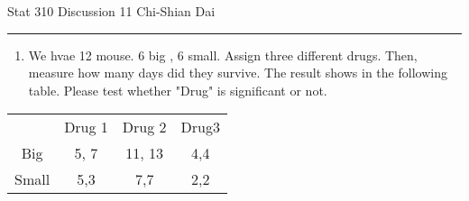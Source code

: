 \documentclass[12pt]{article}
\begin{document}
	\noindent Stat 310 \hfill  Discussion 11 \hfill Chi-Shian Dai
\smallskip
	\hrule
\begin{enumerate}
\item We hvae 12 mouse. 6 big , 6 small. Assign three different drugs. Then, measure how many days did they survive. The result shows in the following table.
Please test whether "Drug" is significant or not.

\end{enumerate}

\begin{table}[h]
	\footnotesize
	\begin{tabular} {cccc}
		&Drug 1&Drug 2& Drug3\\
		Big	& 5, 7 & 11, 13 & 4,4\\
		Small&  5,3 &7,7  & 2,2
	\end{tabular}
\end{table}
\end{document}
